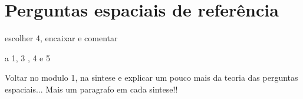 \section{Perguntas espaciais de referência}

escolher 4, encaixar e comentar


a 1, 3 , 4  e 5





Voltar no modulo 1, na sintese e explicar um pouco mais da teoria das perguntas espaciais...
Mais um paragrafo em cada sintese!!